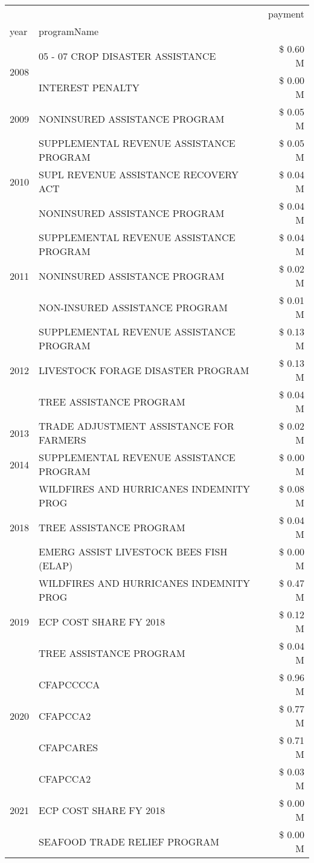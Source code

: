 \begin{tabular}{llr}
\toprule
 &  & payment \\
year & programName &  \\
\midrule
\multirow[t]{2}{*}{2008} & 05 - 07 CROP DISASTER ASSISTANCE & \$ 0.60 M \\
 & INTEREST PENALTY & \$ 0.00 M \\
\cline{1-3}
2009 & NONINSURED ASSISTANCE PROGRAM & \$ 0.05 M \\
\cline{1-3}
\multirow[t]{3}{*}{2010} & SUPPLEMENTAL REVENUE ASSISTANCE PROGRAM & \$ 0.05 M \\
 & SUPL REVENUE ASSISTANCE RECOVERY ACT & \$ 0.04 M \\
 & NONINSURED ASSISTANCE PROGRAM & \$ 0.04 M \\
\cline{1-3}
\multirow[t]{3}{*}{2011} & SUPPLEMENTAL REVENUE ASSISTANCE PROGRAM & \$ 0.04 M \\
 & NONINSURED ASSISTANCE PROGRAM & \$ 0.02 M \\
 & NON-INSURED ASSISTANCE PROGRAM & \$ 0.01 M \\
\cline{1-3}
\multirow[t]{3}{*}{2012} & SUPPLEMENTAL REVENUE ASSISTANCE PROGRAM & \$ 0.13 M \\
 & LIVESTOCK FORAGE DISASTER PROGRAM & \$ 0.13 M \\
 & TREE ASSISTANCE PROGRAM & \$ 0.04 M \\
\cline{1-3}
2013 & TRADE ADJUSTMENT ASSISTANCE FOR FARMERS & \$ 0.02 M \\
\cline{1-3}
2014 & SUPPLEMENTAL REVENUE ASSISTANCE PROGRAM & \$ 0.00 M \\
\cline{1-3}
\multirow[t]{3}{*}{2018} & WILDFIRES AND HURRICANES INDEMNITY PROG & \$ 0.08 M \\
 & TREE ASSISTANCE PROGRAM & \$ 0.04 M \\
 & EMERG ASSIST LIVESTOCK BEES FISH (ELAP) & \$ 0.00 M \\
\cline{1-3}
\multirow[t]{3}{*}{2019} & WILDFIRES AND HURRICANES INDEMNITY PROG & \$ 0.47 M \\
 & ECP COST SHARE FY 2018 & \$ 0.12 M \\
 & TREE ASSISTANCE PROGRAM & \$ 0.04 M \\
\cline{1-3}
\multirow[t]{3}{*}{2020} & CFAPCCCCA & \$ 0.96 M \\
 & CFAPCCA2 & \$ 0.77 M \\
 & CFAPCARES & \$ 0.71 M \\
\cline{1-3}
\multirow[t]{3}{*}{2021} & CFAPCCA2 & \$ 0.03 M \\
 & ECP COST SHARE FY 2018 & \$ 0.00 M \\
 & SEAFOOD TRADE RELIEF PROGRAM & \$ 0.00 M \\
\cline{1-3}
\bottomrule
\end{tabular}
